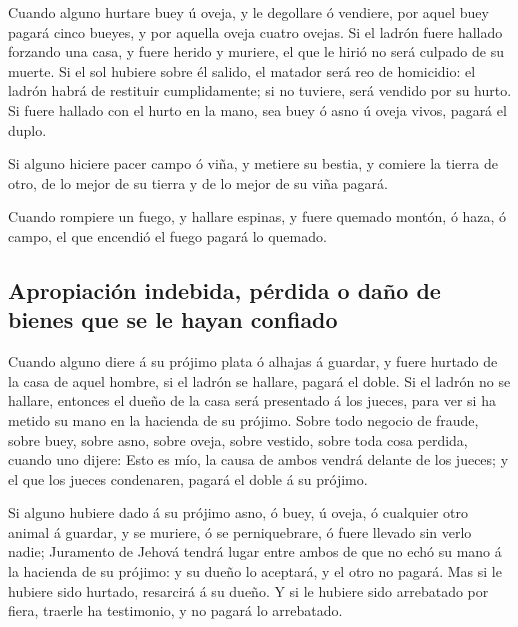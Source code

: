  Cuando alguno hurtare buey ú oveja, y le degollare ó
vendiere, por aquel buey pagará cinco bueyes, y por aquella oveja cuatro
ovejas.  Si el ladrón fuere hallado forzando una casa, y
fuere herido y muriere, el que le hirió no será culpado de su muerte.
 Si el sol hubiere sobre él salido, el matador será reo de
homicidio: el ladrón habrá de restituir cumplidamente; si no tuviere,
será vendido por su hurto.  Si fuere hallado con el hurto
en la mano, sea buey ó asno ú oveja vivos, pagará el duplo.

 Si alguno hiciere pacer campo ó viña, y metiere su
bestia, y comiere la tierra de otro, de lo mejor de su tierra y de lo
mejor de su viña pagará.

 Cuando rompiere un fuego, y hallare espinas, y fuere
quemado montón, ó haza, ó campo, el que encendió el fuego pagará lo
quemado.

\hypertarget{apropiaciuxf3n-indebida-puxe9rdida-o-dauxf1o-de-bienes-que-se-le-hayan-confiado}{%
\subsection{Apropiación indebida, pérdida o daño de bienes que se le
hayan
confiado}\label{apropiaciuxf3n-indebida-puxe9rdida-o-dauxf1o-de-bienes-que-se-le-hayan-confiado}}

 Cuando alguno diere á su prójimo plata ó alhajas á
guardar, y fuere hurtado de la casa de aquel hombre, si el ladrón se
hallare, pagará el doble.  Si el ladrón no se hallare,
entonces el dueño de la casa será presentado á los jueces, para ver si
ha metido su mano en la hacienda de su prójimo.  Sobre
todo negocio de fraude, sobre buey, sobre asno, sobre oveja, sobre
vestido, sobre toda cosa perdida, cuando uno dijere: Esto es mío, la
causa de ambos vendrá delante de los jueces; y el que los jueces
condenaren, pagará el doble á su prójimo.

 Si alguno hubiere dado á su prójimo asno, ó buey, ú
oveja, ó cualquier otro animal á guardar, y se muriere, ó se
perniquebrare, ó fuere llevado sin verlo nadie; 
Juramento de Jehová tendrá lugar entre ambos de que no echó su mano á la
hacienda de su prójimo: y su dueño lo aceptará, y el otro no pagará.
 Mas si le hubiere sido hurtado, resarcirá á su dueño.
 Y si le hubiere sido arrebatado por fiera, traerle ha
testimonio, y no pagará lo arrebatado.

